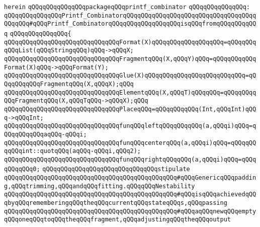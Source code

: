 \verb|herein|\newline
\newline
\verb|qQQqqQQqqQQqqQQqpackageqQQqprintf_combinator|\newline
\verb|qQQqqQQqqQQqqQQq:|\newline
\verb|qQQqqQQqqQQqqQQqPrintf_CombinatorqQQqqQQqqQQqqQQqqQQqqQQqqQQqqQQqqQQqqQQqqQQq#qQQqPrintf_CombinatorqQQqqQQqqQQqqQQqqQQqisqQQqfromqQQqqQQqqQQq|\newline
\verb|qQQqqQQqqQQqqQQq{|\newline
\verb|qQQqqQQqqQQqqQQqqQQqqQQqqQQqqQQqFormat(X)qQQqqQQqqQQqqQQqqQQq=qQQqqQQqqQQqList(qQQqStringqQQq)qQQq->qQQqX;|\newline
\verb|qQQqqQQqqQQqqQQqqQQqqQQqqQQqqQQqFragmentqQQq(X,qQQqY)qQQq=qQQqqQQqqQQqFormat(X)qQQq->qQQqFormat(Y);|\newline
\newline
\verb|qQQqqQQqqQQqqQQqqQQqqQQqqQQqqQQqGlue(X)qQQqqQQqqQQqqQQqqQQqqQQqqQQq=qQQqqQQqqQQqFragmentqQQq(X,qQQqX);qQQq|\newline
\verb|qQQqqQQqqQQqqQQqqQQqqQQqqQQqqQQqElementqQQq(X,qQQqT)qQQqqQQq=qQQqqQQqqQQqFragmentqQQq(X,qQQqTqQQq->qQQqX);qQQq|\newline
\newline
\verb|qQQqqQQqqQQqqQQqqQQqqQQqqQQqqQQqPlaceqQQq=qQQqqQQqqQQq(Int,qQQqInt)qQQq->qQQqInt;|\newline
\newline
\verb|qQQqqQQqqQQqqQQqqQQqqQQqqQQqqQQqfunqQQqleftqQQqqQQqqQQq(a,qQQqi)qQQq=qQQqqQQqqQQqaqQQq-qQQqi;|\newline
\verb|qQQqqQQqqQQqqQQqqQQqqQQqqQQqqQQqfunqQQqcenterqQQq(a,qQQqi)qQQq=qQQqqQQqqQQqint::quotqQQq(aqQQq-qQQqi,qQQq2);|\newline
\verb|qQQqqQQqqQQqqQQqqQQqqQQqqQQqqQQqfunqQQqrightqQQqqQQq(a,qQQqi)qQQq=qQQqqQQqqQQq0;|\newline
\newline
\verb|qQQqqQQqqQQqqQQqqQQqqQQqqQQqqQQqstipulate|\newline
\newline
\verb|qQQqqQQqqQQqqQQqqQQqqQQqqQQqqQQqqQQqqQQqqQQqqQQq#qQQqGenericqQQqpadding,qQQqtrimming,qQQqandqQQqfitting.qQQqqQQqNestability|\newline
\verb|qQQqqQQqqQQqqQQqqQQqqQQqqQQqqQQqqQQqqQQqqQQqqQQq#qQQqisqQQqachievedqQQqbyqQQqrememberingqQQqtheqQQqcurrentqQQqstateqQQqs,qQQqpassing|\newline
\verb|qQQqqQQqqQQqqQQqqQQqqQQqqQQqqQQqqQQqqQQqqQQqqQQq#qQQqaqQQqnewqQQqemptyqQQqoneqQQqtoqQQqtheqQQqfragment,qQQqadjustingqQQqtheqQQqoutput|\newline
